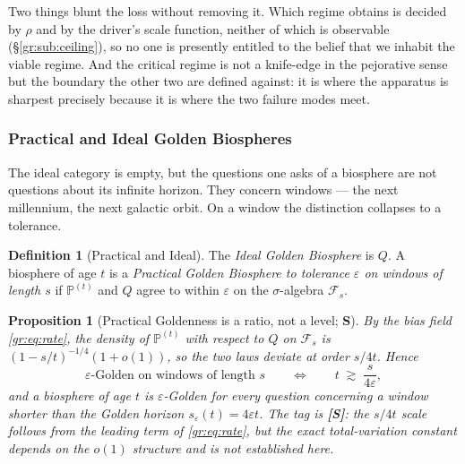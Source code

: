 \documentclass[11pt]{article}
\numberwithin{equation}{section}
\theoremstyle{plain}
\newtheorem{proposition}[theorem]{Proposition}
\theoremstyle{definition}
\newtheorem{definition}[theorem]{Definition}
\theoremstyle{remark}
\newcommand{\PP}{\mathbb{P}}
\begin{document}
Two things blunt the loss without removing it. Which regime obtains is
decided by $\rho$ and by the driver's scale function, neither of which
is observable (\S\ref{gr:sub:ceiling}), so no one is presently entitled
to the belief that we inhabit the viable regime. And the critical regime
is not a knife-edge in the pejorative sense but the boundary the other
two are defined against: it is where the apparatus is sharpest precisely
because it is where the two failure modes meet.

\subsubsection{Practical and Ideal Golden Biospheres}
\label{gr:subsub:practical}

The ideal category is empty, but the questions one asks of a biosphere
are not questions about its infinite horizon. They concern windows ---
the next millennium, the next galactic orbit. On a window the
distinction collapses to a tolerance.

\begin{definition}[Practical and Ideal]\label{gr:def:practical}
The \emph{Ideal Golden Biosphere} is $Q$. A biosphere of age $t$ is a
\emph{Practical Golden Biosphere to tolerance $\varepsilon$ on windows
of length $s$} if $\PP^{(t)}$ and $Q$ agree to within $\varepsilon$ on
the $\sigma$-algebra $\mathcal F_s$.
\end{definition}

\begin{proposition}[Practical Goldenness is a ratio, not a level;
\textbf{S}]\label{gr:prop:ratio}
By the bias field \eqref{gr:eq:rate}, the density of $\PP^{(t)}$ with
respect to $Q$ on $\mathcal F_s$ is $(1-s/t)^{-1/4}(1+o(1))$, so the two
laws deviate at order $s/4t$. Hence
\begin{equation}\label{gr:eq:practical}
\text{$\varepsilon$-Golden on windows of length } s
\qquad\Longleftrightarrow\qquad
t\;\gtrsim\;\frac{s}{4\varepsilon},
\end{equation}
and a biosphere of age $t$ is $\varepsilon$-Golden for every question
concerning a window shorter than the \emph{Golden horizon}
$s_\varepsilon(t)=4\varepsilon t$. The tag is \textbf{[S]}: the $s/4t$
scale follows from the leading term of \eqref{gr:eq:rate}, but the exact
total-variation constant depends on the $o(1)$ structure and is not
established here.
\end{proposition}
\end{document}
